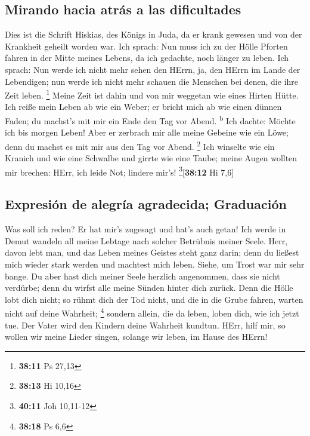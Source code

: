 \hypertarget{mirando-hacia-atruxe1s-a-las-dificultades}{%
\subsection{Mirando hacia atrás a las
dificultades}\label{mirando-hacia-atruxe1s-a-las-dificultades}}

 Dies ist die Schrift Hiskias, des Königs in Juda, da er
krank gewesen und von der Krankheit geheilt worden war. 
Ich sprach: Nun muss ich zu der Hölle Pforten fahren in der Mitte meines
Lebens, da ich gedachte, noch länger zu leben.  Ich
sprach: Nun werde ich nicht mehr sehen den HErrn, ja, den HErrn im Lande
der Lebendigen; nun werde ich nicht mehr schauen die Menschen bei denen,
die ihre Zeit leben. \footnote{\textbf{38:11} Ps 27,13} 
Meine Zeit ist dahin und von mir weggetan wie eines Hirten Hütte. Ich
reiße mein Leben ab wie ein Weber; er bricht mich ab wie einen dünnen
Faden; du machst's mit mir ein Ende den Tag vor Abend.
\textsuperscript{b}  Ich dachte: Möchte ich bis morgen
Leben! Aber er zerbrach mir alle meine Gebeine wie ein Löwe; denn du
machst es mit mir aus den Tag vor Abend. \footnote{\textbf{38:13} Hi
  10,16}  Ich winselte wie ein Kranich und wie eine
Schwalbe und girrte wie eine Taube; meine Augen wollten mir brechen:
HErr, ich leide Not; lindere mir's! \footnote{\textbf{40:11} Joh
  10,11-12}{[}\textbf{38:12} Hi 7,6{]}

\hypertarget{expresiuxf3n-de-alegruxeda-agradecida-graduaciuxf3n}{%
\subsection{Expresión de alegría agradecida;
Graduación}\label{expresiuxf3n-de-alegruxeda-agradecida-graduaciuxf3n}}

 Was soll ich reden? Er hat mir's zugesagt und hat's auch
getan! Ich werde in Demut wandeln all meine Lebtage nach solcher
Betrübnis meiner Seele.  Herr, davon lebt man, und das
Leben meines Geistes steht ganz darin; denn du ließest mich wieder stark
werden und machtest mich leben.  Siehe, um Trost war mir
sehr bange. Du aber hast dich meiner Seele herzlich angenommen, dass sie
nicht verdürbe; denn du wirfst alle meine Sünden hinter dich zurück.
 Denn die Hölle lobt dich nicht; so rühmt dich der Tod
nicht, und die in die Grube fahren, warten nicht auf deine Wahrheit;
\footnote{\textbf{38:18} Ps 6,6}  sondern allein, die da
leben, loben dich, wie ich jetzt tue. Der Vater wird den Kindern deine
Wahrheit kundtun.  HErr, hilf mir, so wollen wir meine
Lieder singen, solange wir leben, im Hause des HErrn!

